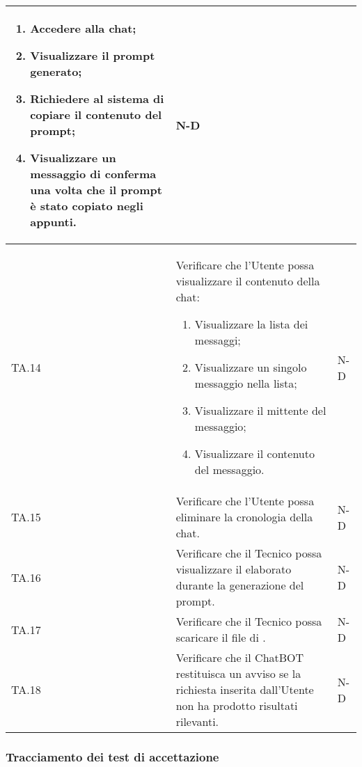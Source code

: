 \begin{adjustwidth}{-0.5cm}{-0.5cm}
\begin{longtable}{|P{1.5cm}|>{\raggedright}P{9.5cm}|>{\arraybackslash}P{1.5cm}|}
\begin{enumerate}
			\item Accedere alla chat;
			\item Visualizzare il prompt generato;
			\item Richiedere al sistema di copiare il contenuto del prompt;
			\item Visualizzare un messaggio di conferma una volta che il prompt è stato copiato negli appunti.				
		\end{enumerate}
		& N-D \\
		\hline TA.14 & Verificare che l'Utente possa visualizzare il contenuto della chat: 
		\begin{enumerate}
			\item Visualizzare la lista dei messaggi;
			\item Visualizzare un singolo messaggio nella lista;
			\item Visualizzare il mittente del messaggio;
			\item Visualizzare il contenuto del messaggio.						
		\end{enumerate}
		& N-D \\
		\hline TA.15 & Verificare che l'Utente possa eliminare la cronologia della chat. & N-D \\
		\hline TA.16 & Verificare che il Tecnico possa visualizzare il  elaborato durante la generazione del prompt. & N-D \\
		\hline TA.17 & Verificare che il Tecnico possa scaricare il file di . & N-D \\
		\hline TA.18 & Verificare che il ChatBOT restituisca un avviso se la richiesta inserita dall'Utente non ha prodotto risultati rilevanti. & N-D \\
	\end{longtable}
\end{adjustwidth}
\egroup

\clearpage
\subsubsection{Tracciamento dei test di accettazione}

